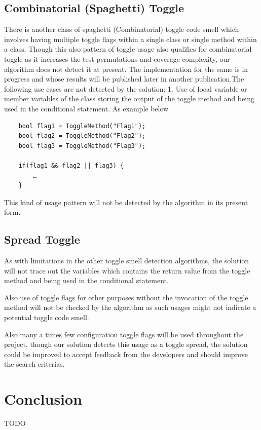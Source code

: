 \documentclass[conference]{IEEEtran}
\begin{document}
\subsection{Combinatorial (Spaghetti) Toggle}
There is another class of spaghetti (Combinatorial) toggle code smell which involves having multiple toggle flags within a single class or single method within a class. Though this also pattern of toggle usage also qualifies for combinatorial toggle as it increases the test permutations and coverage complexity, our algorithm does not detect it at present. The implementation for the same is in progress and whose results will be published later in another publication.The following use cases are not detected by the solution: 
	1. Use of local variable or member variables of the class storing the output of the toggle method and being used in the conditional statement. As example below
\begin{lstlisting}
	bool flag1 = ToggleMethod("Flag1");
	bool flag2 = ToggleMethod("Flag2");
	bool flag3 = ToggleMethod("Flag3");

	if(flag1 && flag2 || flag3) {
		…
	}
\end{lstlisting}
	This kind of usage pattern will not be detected by the algorithm in its present form.
\subsection{Spread Toggle}
	As with limitations in the other toggle smell detection algorithms, the solution will not trace out the variables which contains the return value from the toggle method and being used in the conditional statement. 

Also use of toggle flags for other purposes without the invocation of the toggle method will not be checked by the algorithm as such usages might not indicate a potential toggle code smell.

Also many a times few configuration toggle flags will be used throughout the project, though our solution detects this usage as a toggle spread, the solution could be improved to accept feedback from the developers and should improve the search criterias.

\section{Conclusion}
\label{conclusion}
TODO





\balance
\end{document}
